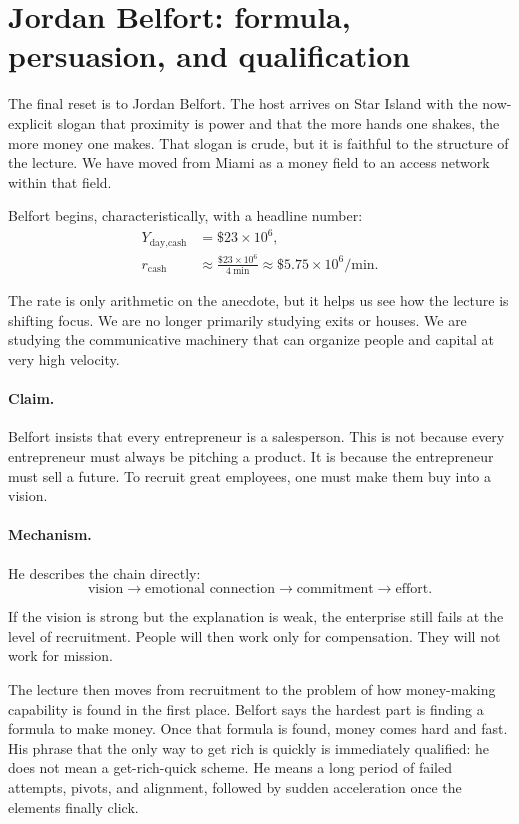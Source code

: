 \section{Jordan Belfort: formula, persuasion, and qualification}

The final reset is to Jordan Belfort. The host arrives on Star Island with the now-explicit slogan that proximity is power and that the more hands one shakes, the more money one makes. That slogan is crude, but it is faithful to the structure of the lecture. We have moved from Miami as a money field to an access network within that field.

Belfort begins, characteristically, with a headline number:
\begin{align}
Y_{\text{day,cash}} &= \$23 \times 10^6,\\
r_{\text{cash}} &\approx \frac{\$23 \times 10^6}{4\ \text{min}} \approx \$5.75 \times 10^6/\text{min}.
\end{align}

The rate is only arithmetic on the anecdote, but it helps us see how the lecture is shifting focus. We are no longer primarily studying exits or houses. We are studying the communicative machinery that can organize people and capital at very high velocity.

\paragraph{Claim.}
Belfort insists that every entrepreneur is a salesperson. This is not because every entrepreneur must always be pitching a product. It is because the entrepreneur must sell a future. To recruit great employees, one must make them buy into a vision.

\paragraph{Mechanism.}
He describes the chain directly:
\begin{equation}
\text{vision} \longrightarrow \text{emotional connection} \longrightarrow \text{commitment} \longrightarrow \text{effort}.
\end{equation}

If the vision is strong but the explanation is weak, the enterprise still fails at the level of recruitment. People will then work only for compensation. They will not work for mission.

The lecture then moves from recruitment to the problem of how money-making capability is found in the first place. Belfort says the hardest part is finding a formula to make money. Once that formula is found, money comes hard and fast. His phrase that the only way to get rich is quickly is immediately qualified: he does not mean a get-rich-quick scheme. He means a long period of failed attempts, pivots, and alignment, followed by sudden acceleration once the elements finally click.

